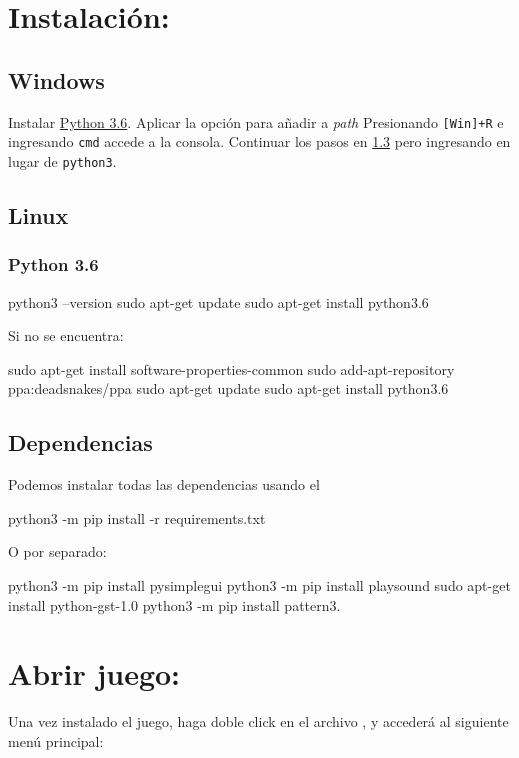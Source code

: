 \section{Instalación:}

\subsection{Windows}
 Instalar \href{https://www.python.org/downloads/release/python-368/}{Python 3.6}. Aplicar la opción para añadir a \emph{path}
 Presionando \texttt{[Win]+R} e ingresando \texttt{cmd} accede a la consola. Continuar los pasos en \ref{dep} pero ingresando  en lugar de \texttt{python3}.

\subsection{Linux}

\subsubsection{Python 3.6}
\begin{cverbatim}
python3 --version
sudo apt-get update
sudo apt-get install python3.6
\end{cverbatim}
Si no se encuentra:
\begin{cverbatim}
sudo apt-get install software-properties-common
sudo add-apt-repository ppa:deadsnakes/ppa
sudo apt-get update
sudo apt-get install python3.6
\end{cverbatim}

\subsection{Dependencias}\label{dep}

Podemos instalar todas las dependencias usando el 
\begin{cverbatim}
python3 -m pip install -r requirements.txt
\end{cverbatim}

O por separado:
\begin{cverbatim}
python3 -m pip install pysimplegui
python3 -m pip install playsound
sudo apt-get install python-gst-1.0
python3 -m pip install pattern3.
\end{cverbatim}
\section{Abrir juego:}
Una vez instalado el juego, haga doble click en el archivo , y accederá al siguiente menú principal:


